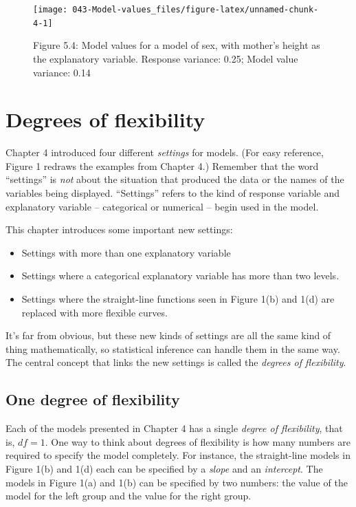 \documentclass[]{tufte-book}
\providecommand{\tightlist}{%
  \setlength{\itemsep}{0pt}\setlength{\parskip}{0pt}}
\begin{document}
\begin{figure}\texttt{[image: 043-Model-values\_files/figure-latex/unnamed-chunk-4-1]} \caption[Figure 5.4: Model values for a model of sex, with mother's height as the explanatory variable. Response variance: 0.25; Model value variance: 0.14]{Figure 5.4: Model values for a model of sex, with mother's height as the explanatory variable. Response variance: 0.25; Model value variance: 0.14}\label{fig:unnamed-chunk-4}
\end{figure}



\hypertarget{degrees-of-flexibility}{%
\chapter{Degrees of flexibility}\label{degrees-of-flexibility}}

Chapter 4 introduced four different \emph{settings} for models. (For easy reference, Figure 1 redraws the examples from Chapter 4.) Remember that the word ``settings'' is \emph{not} about the situation that produced the data or the names of the variables being displayed. ``Settings'' refers to the kind of response variable and explanatory variable -- categorical or numerical -- begin used in the model.

This chapter introduces some important new settings:

\begin{itemize}
\tightlist
\item
  Settings with more than one explanatory variable
\item
  Settings where a categorical explanatory variable has more than two levels.
\item
  Settings where the straight-line functions seen in Figure 1(b) and 1(d) are replaced with more flexible curves.
\end{itemize}

It's far from obvious, but these new kinds of settings are all the same kind of thing mathematically, so statistical inference can handle them in the same way. The central concept that links the new settings is called the \emph{degrees of flexibility}.

\hypertarget{one-degree-of-flexibility}{%
\section{One degree of flexibility}\label{one-degree-of-flexibility}}

Each of the models presented in Chapter 4 has a single \emph{degree of flexibility}, that is, \(df = 1\). One way to think about degrees of flexibility is how many numbers are required to specify the model completely. For instance, the straight-line models in Figure 1(b) and 1(d) each can be specified by a \emph{slope} and an \emph{intercept}. The models in Figure 1(a) and 1(b) can be specified by two numbers: the value of the model for the left group and the value for the right group.
\end{document}
